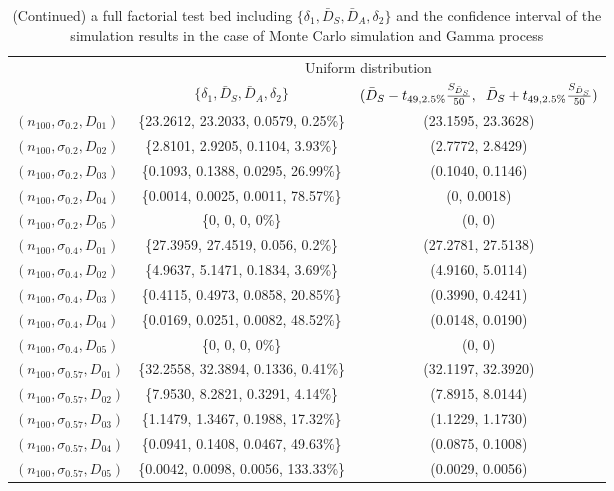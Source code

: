\documentclass[preprint,12pt]{elsarticle}
\begin{document}
\begin{table} [h]
\caption{(Continued) a full factorial test bed including $\{\delta_{1}, \bar{D}_{S}, \bar{D}_{A}, \delta_{2}\}$ and the confidence interval of the simulation results in the case of Monte Carlo simulation and Gamma process}
\begin{tabular}{|l|c c|}

\hline
&\multicolumn{2}{|c|}{Uniform distribution}\\
&$\{\delta_{1}, \bar{D}_{S}, \bar{D}_{A}, \delta_{2}\}$& $(\bar{D}_{S}-t_{49,2.5\%}\frac{S_{\bar{D}_{S}}}{50},\hspace{2mm}\bar{D}_{S}+t_{49,2.5\%}\frac{S_{\bar{D}_{S}}}{50})$ \\
\hline
$(n_{100},\sigma_{0.2},D_{01})$ &\{23.2612, 23.2033, 0.0579, 0.25\%\}&(23.1595, 23.3628)\\
$(n_{100},\sigma_{0.2},D_{02})$ &\{2.8101, 2.9205, 0.1104, 3.93\%\}&(2.7772, 2.8429)\\
$(n_{100},\sigma_{0.2},D_{03})$ &\{0.1093, 0.1388, 0.0295, 26.99\%\}&(0.1040, 0.1146)\\
$(n_{100},\sigma_{0.2},D_{04})$ &\{0.0014, 0.0025, 0.0011, 78.57\%\}&(0, 0.0018)\\
$(n_{100},\sigma_{0.2},D_{05})$ &\{0, 0, 0, 0\%\}&(0, 0)\\
$(n_{100},\sigma_{0.4},D_{01})$ &\{27.3959, 27.4519, 0.056, 0.2\%\}&(27.2781, 27.5138)\\
$(n_{100},\sigma_{0.4},D_{02})$ &\{4.9637, 5.1471, 0.1834, 3.69\%\}&(4.9160, 5.0114)\\
$(n_{100},\sigma_{0.4},D_{03})$ &\{0.4115, 0.4973, 0.0858, 20.85\%\}&(0.3990, 0.4241)\\
$(n_{100},\sigma_{0.4},D_{04})$ &\{0.0169, 0.0251, 0.0082, 48.52\%\}&(0.0148, 0.0190)\\
$(n_{100},\sigma_{0.4},D_{05})$ &\{0, 0, 0, 0\%\}&(0, 0)\\
$(n_{100},\sigma_{0.57},D_{01})$ &\{32.2558, 32.3894, 0.1336, 0.41\%\}&(32.1197, 32.3920)\\
$(n_{100},\sigma_{0.57},D_{02})$ &\{7.9530, 8.2821, 0.3291, 4.14\%\}&(7.8915, 8.0144)\\
$(n_{100},\sigma_{0.57},D_{03})$ &\{1.1479, 1.3467, 0.1988, 17.32\%\}&(1.1229, 1.1730)\\
$(n_{100},\sigma_{0.57},D_{04})$ &\{0.0941, 0.1408, 0.0467, 49.63\%\}&(0.0875, 0.1008)\\
$(n_{100},\sigma_{0.57},D_{05})$ &\{0.0042, 0.0098, 0.0056, 133.33\%\}&(0.0029, 0.0056)\\
\hline
\end{tabular}
\end{table}
\end{document}
